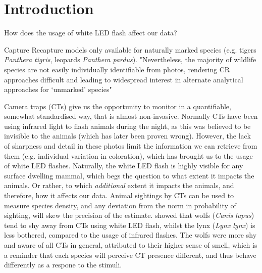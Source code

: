 \chapter{Introduction}


How does the usage of white LED flash affect our data?





Capture Recapture models only available for naturally marked species (e.g. tigers \textit{Panthera tigris}, leopards \textit{Panthera pardus}). 
"Nevertheless, the majority of wildlife species are not easily individually identifiable from photos, rendering CR approaches difficult and leading to widespread interest in alternate analytical approaches for ‘unmarked’ species" \cite{Burton2015} %


Camera traps (CTs) give us the opportunity to monitor in a quantifiable, somewhat standardised way, that is almost non-invasive. 
Normally CTs have been using infrared light to flash animals during the night, as this was believed to be invisible to the animals (which has later been proven wrong). %
However, the lack of sharpness and detail in these photos limit the information we can retrieve from them (e.g. individual variation in coloration), which has brought us to the usage of white LED flashes.
Naturally, the white LED flash is highly visible for any surface dwelling mammal, which begs the question to what extent it impacts the animals. Or rather, to which \textit{additional} extent it impacts the animals, and therefore, how it affects our data. Animal sightings by CTs can be used to measure species density, and any deviation from the norm in probability of sighting, will skew the precision of the estimate.
\cite{Beddari2019} showed that wolfs (\textit{Canis lupus}) tend to shy away from CTs using white LED flash, whilst the lynx (\textit{Lynx lynx}) is less bothered, compared to the usage of infrared flashes. %
The wolfs were more shy and aware of all CTs in general, attributed to their higher sense of smell, which is a reminder that each species will perceive CT presence different, and thus behave differently as a respone to the stimuli.

